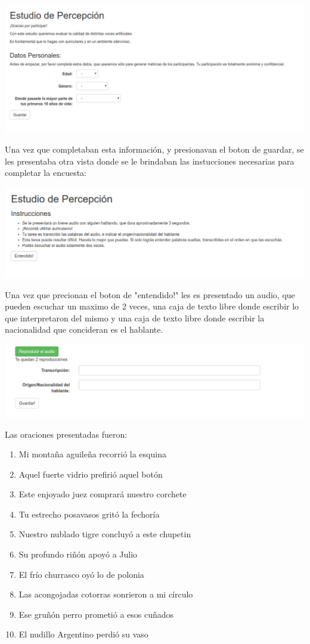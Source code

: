 \includegraphics[scale=0.5]{estudio_online/estudio1.png}

Una vez que completaban esta información, y presionavan el boton de guardar, se les presentaba otra vista donde se le brindaban las instucciones necesarias para completar la encuesta:

\includegraphics[scale=0.5]{estudio_online/estudio2.png}

Una vez que precionan el boton de "entendido!" les es presentado un audio, que pueden escuchar un maximo de 2 veces, una caja de texto libre donde escribir lo que interpretaron del mismo y una caja de texto libre donde escribir la nacionalidad que concideran es el hablante.

\includegraphics[scale=0.5]{estudio_online/estudio3.png}


Las oraciones presentadas fueron:

\begin{enumerate}
\item Mi montaña aguileña recorrió la esquina
\item Aquel fuerte vidrio prefirió aquel botón
\item Este enjoyado juez comprará nuestro corchete
\item Tu estrecho posavasos gritó la fechoría
\item Nuestro nublado tigre concluyó a este chupetin
\item Su profundo riñón apoyó a Julio
\item El frío churrasco oyó lo de polonia
\item Las acongojadas cotorras sonrieron a mi círculo
\item Ese gruñón perro prometió a esos cuñados
\item El nudillo Argentino perdió su vaso
\end{enumerate}


